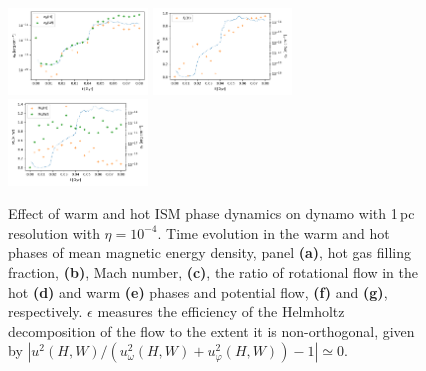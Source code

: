 \documentclass[iop,apj,numberedappendix,twocolappendix]{emulateapj}
\begin{document}
\begin{figure}
\centering
\includegraphics[trim=0.0cm 0.0cm 0.0cm 0.0cm,clip=true,width=0.33\textwidth]{csc_figs/efrac_hot-1e4K_pb1pcPm0e-4_0.png}
\includegraphics[trim=0.0cm 0.0cm 0.0cm 0.0cm,clip=true,width=0.33\textwidth]{csc_figs/efrac_hot-1e4K_fV1pcPm0e-4_0.png}
\includegraphics[trim=0.0cm 0.0cm 0.0cm 0.0cm,clip=true,width=0.33\textwidth]{csc_figs/efrac_hot-1e4K_Ma1pcPm0e-4_0.png}
\caption{
Effect of warm and hot ISM phase dynamics on dynamo with 1\,pc resolution with
$\eta=10^{-4}$.
Time evolution in the warm and hot phases of mean magnetic energy density,
panel {\bf{(a)}}, hot gas filling fraction, {\bf{(b)}},
Mach number, {\bf{(c)}}, the ratio of rotational flow in the
hot {\bf{(d)}} and warm {\bf{(e)}} phases and potential flow, {\bf{(f)}} and
{\bf{(g)}}, respectively.
$\epsilon$ measures the efficiency of the Helmholtz decomposition
of the flow to the extent it is non-orthogonal, given by 
$|u^2(H,W)/(u^2_\omega(H,W)+u^2_\varphi(H,W))-1|\simeq0$.
\label{fig:1pc-phases}
}
\end{figure}
\end{document}
